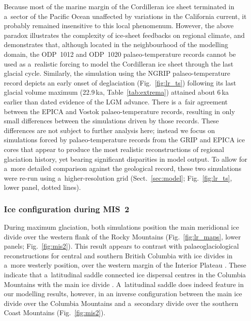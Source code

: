 \documentclass[tc, manuscript]{copernicus}
\begin{document}
      Because most of the marine margin of the Cordilleran ice sheet
      terminated in a~sector of the Pacific Ocean unaffected by variations
      in the California current, it probably remained insensitive to this
      local phenomenum. However, the above paradox illustrates the
      complexity of ice-sheet feedbacks on regional climate, and
      demonstrates that, although located in the neighbourhood of the
      modelling domain, the ODP~1012 and ODP~1020 palaeo-temperature records
      cannot be used as a~realistic forcing to model the Cordilleran ice
      sheet through the last glacial cycle. Similarly, the simulation using
      the NGRIP palaeo-temperature record depicts an early onset of
      deglaciation (Fig.~\ref{fig:lr_ts}) following its last glacial volume
      maximum (22.9\,\unit{ka}, Table~\ref{tab:extrema}) attained about
      6\,\unit{ka} earlier than dated evidence of the LGM advance. There is
      a~fair agreement between the EPICA and Vostok palaeo-temperature
      records, resulting in only small differences between the simulations
      driven by those records. These differences are not subject to further
      analysis here; instead we focus on simulations forced by
      palaeo-temperature records from the GRIP and EPICA ice cores that
      appear to produce the most realistic reconstructions of regional
      glaciation history, yet bearing significant disparities in model
      output. To allow for a~more detailed comparison against the geological
      record, these two simulations were re-run using a~higher-resolution
      grid (Sect.~\ref{sec:model}; Fig.~\ref{fig:lr_ts}, lower panel, dotted
      lines).


\subsubsection{Ice configuration during MIS~2}
\label{sec:mis2}

      During maximum glaciation, both simulations position the main
      meridional ice divide over the western flank of the Rocky Mountains
      (Fig.~\ref{fig:lr_maps}, lower panels; Fig.~\ref{fig:mis2}). This
      result appears to contrast with palaeoglaciological reconstructions
      for central and southern British Columbia with ice divides in a~more
      westerly position, over the western margin of the Interior Plateau
      \citep{Ryder.etal.1991, Stumpf.etal.2000, Kleman.etal.2010,
      Clague.Ward.2011, Margold.etal.2013a}. These indicate that
      a~latitudinal saddle connected ice dispersal centres in the Columbia
      Mountains with the main ice divide \citep{Ryder.etal.1991,
      Kleman.etal.2010, Clague.Ward.2011, Margold.etal.2013a}. A~latitudinal
      saddle does indeed feature in our modelling results, however, in an
      inverse configuration between the main ice divide over the Columbia
      Mountains and a~secondary divide over the southern Coast Mountains
      (Fig.~\ref{fig:mis2}).
\end{document}
